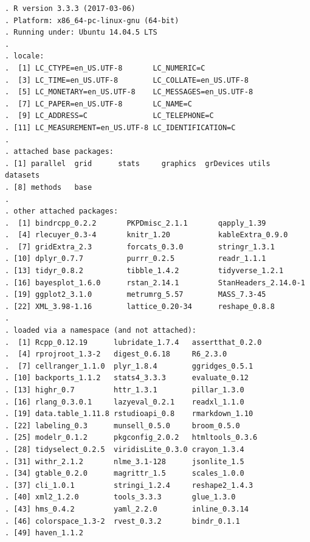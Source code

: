\documentclass[]{article}
\begin{document}
\begin{verbatim}
. R version 3.3.3 (2017-03-06)
. Platform: x86_64-pc-linux-gnu (64-bit)
. Running under: Ubuntu 14.04.5 LTS
. 
. locale:
.  [1] LC_CTYPE=en_US.UTF-8       LC_NUMERIC=C              
.  [3] LC_TIME=en_US.UTF-8        LC_COLLATE=en_US.UTF-8    
.  [5] LC_MONETARY=en_US.UTF-8    LC_MESSAGES=en_US.UTF-8   
.  [7] LC_PAPER=en_US.UTF-8       LC_NAME=C                 
.  [9] LC_ADDRESS=C               LC_TELEPHONE=C            
. [11] LC_MEASUREMENT=en_US.UTF-8 LC_IDENTIFICATION=C       
. 
. attached base packages:
. [1] parallel  grid      stats     graphics  grDevices utils     datasets 
. [8] methods   base     
. 
. other attached packages:
.  [1] bindrcpp_0.2.2       PKPDmisc_2.1.1       qapply_1.39         
.  [4] rlecuyer_0.3-4       knitr_1.20           kableExtra_0.9.0    
.  [7] gridExtra_2.3        forcats_0.3.0        stringr_1.3.1       
. [10] dplyr_0.7.7          purrr_0.2.5          readr_1.1.1         
. [13] tidyr_0.8.2          tibble_1.4.2         tidyverse_1.2.1     
. [16] bayesplot_1.6.0      rstan_2.14.1         StanHeaders_2.14.0-1
. [19] ggplot2_3.1.0        metrumrg_5.57        MASS_7.3-45         
. [22] XML_3.98-1.16        lattice_0.20-34      reshape_0.8.8       
. 
. loaded via a namespace (and not attached):
.  [1] Rcpp_0.12.19      lubridate_1.7.4   assertthat_0.2.0 
.  [4] rprojroot_1.3-2   digest_0.6.18     R6_2.3.0         
.  [7] cellranger_1.1.0  plyr_1.8.4        ggridges_0.5.1   
. [10] backports_1.1.2   stats4_3.3.3      evaluate_0.12    
. [13] highr_0.7         httr_1.3.1        pillar_1.3.0     
. [16] rlang_0.3.0.1     lazyeval_0.2.1    readxl_1.1.0     
. [19] data.table_1.11.8 rstudioapi_0.8    rmarkdown_1.10   
. [22] labeling_0.3      munsell_0.5.0     broom_0.5.0      
. [25] modelr_0.1.2      pkgconfig_2.0.2   htmltools_0.3.6  
. [28] tidyselect_0.2.5  viridisLite_0.3.0 crayon_1.3.4     
. [31] withr_2.1.2       nlme_3.1-128      jsonlite_1.5     
. [34] gtable_0.2.0      magrittr_1.5      scales_1.0.0     
. [37] cli_1.0.1         stringi_1.2.4     reshape2_1.4.3   
. [40] xml2_1.2.0        tools_3.3.3       glue_1.3.0       
. [43] hms_0.4.2         yaml_2.2.0        inline_0.3.14    
. [46] colorspace_1.3-2  rvest_0.3.2       bindr_0.1.1      
. [49] haven_1.1.2
\end{verbatim}
\end{document}

